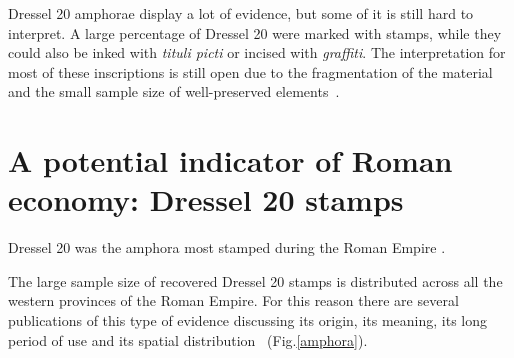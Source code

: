 \documentclass[review]{elsarticle}
\newcommand{\memo}[2]{\textcolor{#1}{#2}}
\newcommand{\xavi}[1]{\memo{magenta}{XRC: #1\\}}
\begin{document}



Dressel 20 amphorae display a lot of evidence, but some of it is still hard to interpret. A large percentage of Dressel 20 were marked with stamps, while they could also be inked with \textit{tituli picti} or incised with \textit{graffiti}. The interpretation for most of these inscriptions is still open due to the fragmentation of the material and the small sample size of well-preserved elements~\citep{aguilera_evolucion_2007,rovira_guardiola_grafitos_2007}. 

 

\section{A potential indicator of Roman economy: Dressel 20 stamps}

Dressel 20 was the amphora most stamped during the Roman Empire \citep[18]{millet_anforas_1998}. 




The large sample size of recovered Dressel 20 stamps is distributed across all the western provinces of the Roman Empire. For this reason there are several publications of this type of evidence discussing its origin, its meaning, its long period of use and its spatial distribution~\citep{dressel_ricerche_1878,
rodriguez_economioleicola_1977,
chicepi1985,millet_anforas_1998, remesal_sellar_2016} (Fig.\ref{amphora}).

\end{document}
